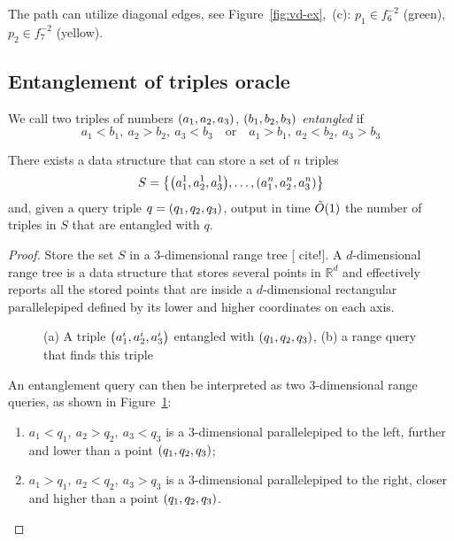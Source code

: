 \documentclass[a4paper,11pt]{article}
\begin{document}
The path can utilize diagonal edges, see Figure~\ref{fig:vd-ex},~(c): \(p_1 \in f_6^{-2}\) (green), \(p_2 \in f_7^{-2}\) (yellow).


\subsection{Entanglement of triples oracle}

\begin{definition}
	We call two triples of numbers \(\lr*{a_1, a_2, a_3}\),
	\(\lr*{b_1, b_2, b_3}\) \emph{entangled} if
	\[ a_1 < b_1,\ a_2 > b_2,\ a_3 < b_3\quad\text{or}\quad
	   a_1 > b_1,\ a_2 < b_2,\ a_3 > b_3\]
\end{definition}

\begin{theorem} \label{thm:entgtripls}
	There exists a data structure that can store a set of \(n\) triples
	\[S = \set*{\lr*{a^1_1, a^1_2, a^1_3}, \ldots, \lr*{a^n_1, a^n_2, a^n_3}}\]
	and, given a query triple \(q = \lr*{q_1, q_2, q_3}\), output
	in time \(\Ot\lr*{1}\)  %
	the number of triples in \(S\) that are entangled with \(q\).
\end{theorem}

\begin{proof}
	Store the set \(S\) in a 3-dimensional range tree [{\color{magenta} cite!}].
	A \(d\)-dimensional range tree is a data structure that stores several points
	in \(\mathbb{R}^d\) and effectively reports all the stored points that are
	inside a \(d\)-dimensional rectangular parallelepiped defined by
	its lower and higher coordinates on each axis.

\begin{figure}[ht] \centering
	

	\caption{(a) A triple \(\lr*{a^i_1, a^i_2, a^i_3}\) entangled
	with \(\lr*{q_1, q_2, q_3}\),
	         (b) a range query that finds this triple}
	\label{fig:paral-trans}
\end{figure}

	An entanglement query can then be interpreted as two 3-dimensional range
	queries, as shown in Figure~\ref{fig:paral-trans}:
   \begin{enumerate}
	\item \(a_1 < q_1,\ a_2 > q_2,\ a_3 < q_3\) is a 3-dimensional parallelepiped
	  to the left, further and lower than a point \(\lr*{q_1, q_2, q_3}\);
	\item \(a_1 > q_1,\ a_2 < q_2,\ a_3 > q_3\) is a 3-dimensional parallelepiped
	  to the right, closer and higher than a point \(\lr*{q_1, q_2, q_3}\).
   \end{enumerate}
\end{proof}
\end{document}
